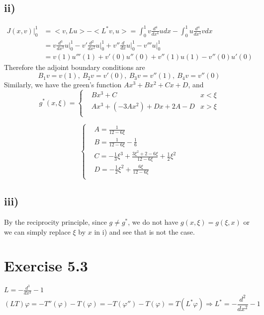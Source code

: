 \documentclass[a4paper, 11pt]{article}
\begin{document}
\begin{spacing}{1.5}
\subsection*{ii)}
\begin{align*}
J(x,v)\Big|_0^1 & = <v,Lu> - <L^*v,u> = \int_{0}^{1} v \frac{d^4}{dx^4} udx - \int_{0}^{1} u\frac{d^4}{dx^4} v dx \\
& = v\frac{d^3}{dx^3} u \Big|_0^1 - v' \frac{d^2}{dx^2} u \Big|_0^1 + v''\frac{d}{dx} u \Big|_0^1 - v'''u\Big|_0^1 \\
& = v(1)u'''(1) + v'(0) u''(0) + v''(1)u(1) - v''(0)u'(0)
\end{align*}
Therefore the adjoint boundary conditions are 
$$
B_1v = v(1), \ B_2v = v'(0) , \ B_3v = v''(1) , \ B_4v = v''(0)
$$
Similarly, we have the green's function $Ax^3+Bx^2+Cx+D$, and 
$$
g^*(x,\xi) = \left\{
\begin{aligned}
& Bx^3 +C   &x<\xi\\
& Ax^3 + (-3Ax^2) +Dx +2A - D &x>\xi\\
\end{aligned}
\right.
$$

$$
\left\{
\begin{aligned}
& A = \frac{1}{12-6\xi}  \\
& B = \frac{1}{12-6\xi} - \frac{1}{6} \\
& C = -\frac{1}{3} \xi^3 + \frac{3\xi^2+2-6\xi}{12-6\xi} + \frac{1}{2}\xi^2 \\
& D = -\frac{1}{2} \xi^2 + \frac{6\xi}{12-6\xi} \\
\end{aligned}
\right.
$$

\subsection*{iii)}
By the reciprocity principle, since $g \neq g^*$, we do not have $g(x,\xi) = g(\xi,x) $ or we can simply replace $\xi$ by $x$ in i) and see that is not the case.

\section*{Exercise 5.3}
$L = -\frac{d^3}{dx^3} -1$
$$
(LT)\varphi = -T''(\varphi) - T(\varphi) = - T(\varphi'') - T(\varphi) = T(L^*\varphi) \Rightarrow L^* = -\frac{d^2}{dx^2} -1 
$$


\end{spacing}
\end{document}
